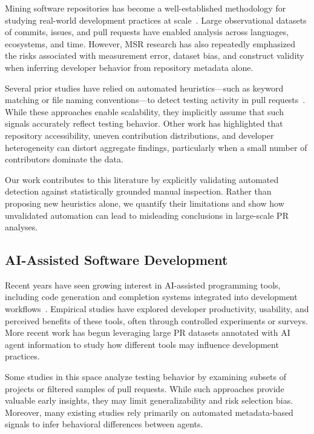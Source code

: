 \documentclass[conference]{IEEEtran}
\begin{document}
Mining software repositories has become a well-established methodology for studying real-world development practices at scale~\cite{baltes2018sotorrent, asaduzzaman2013answer}. Large observational datasets of commits, issues, and pull requests have enabled analysis across languages, ecosystems, and time. However, MSR research has also repeatedly emphasized the risks associated with measurement error, dataset bias, and construct validity when inferring developer behavior from repository metadata alone.

Several prior studies have relied on automated heuristics---such as keyword matching or file naming conventions---to detect testing activity in pull requests~\cite{calefato2018ask, mi2017empirical}. While these approaches enable scalability, they implicitly assume that such signals accurately reflect testing behavior. Other work has highlighted that repository accessibility, uneven contribution distributions, and developer heterogeneity can distort aggregate findings, particularly when a small number of contributors dominate the data.

Our work contributes to this literature by explicitly validating automated detection against statistically grounded manual inspection. Rather than proposing new heuristics alone, we quantify their limitations and show how unvalidated automation can lead to misleading conclusions in large-scale PR analyses.

\subsection{AI-Assisted Software Development}

Recent years have seen growing interest in AI-assisted programming tools, including code generation and completion systems integrated into development workflows~\cite{vaithilingam2022expectation, finnie2022robots, chen2021evaluating}. Empirical studies have explored developer productivity, usability, and perceived benefits of these tools, often through controlled experiments or surveys. More recent work has begun leveraging large PR datasets annotated with AI agent information to study how different tools may influence development practices.

Some studies in this space analyze testing behavior by examining subsets of projects or filtered samples of pull requests. While such approaches provide valuable early insights, they may limit generalizability and risk selection bias. Moreover, many existing studies rely primarily on automated metadata-based signals to infer behavioral differences between agents.
\end{document}

